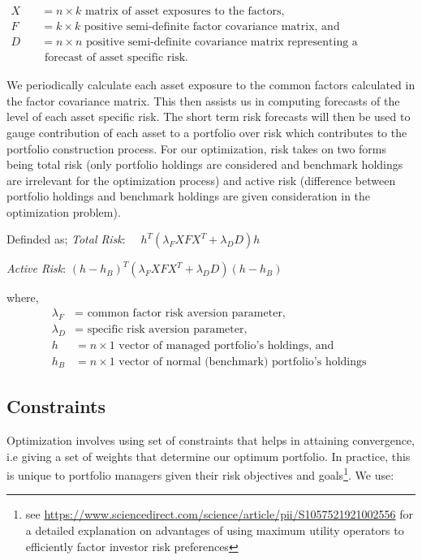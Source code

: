 \documentclass[10pt,preprint, authoryear]{elsarticle}
\numberwithin{equation}{section}
\numberwithin{figure}{section}
\numberwithin{table}{section}
\let\rmarkdownfootnote\footnote%
\def\footnote{\protect\rmarkdownfootnote}
\begin{document}
\(\begin{array} {ll}X & =n \times k \text { matrix of asset exposures to the factors, } \\ F \quad &= k \times k \text { positive semi-definite factor covariance matrix, and } \\ D \quad &=n \times n \text { positive semi-definite covariance matrix representing a } \\ & \text { forecast of asset specific risk. }\end{array}\)

We periodically calculate each asset exposure to the common factors
calculated in the factor covariance matrix. This then assists us in
computing forecasts of the level of each asset specific risk. The short
term risk forecasts will then be used to gauge contribution of each
asset to a portfolio over risk which contributes to the portfolio
construction process. For our optimization, risk takes on two forms
being total risk (only portfolio holdings are considered and benchmark
holdings are irrelevant for the optimization process) and active risk
(difference between portfolio holdings and benchmark holdings are given
consideration in the optimization problem).

Definded as; \emph{Total Risk}:
\(\quad h^T\left(\lambda_F X F X^T+\lambda_D D\right) h\)

\emph{Active Risk}:
\(\left(h-h_B\right)^T\left(\lambda_F X F X^T+\lambda_D D\right)\left(h-h_B\right)\)

where, \[
\begin{aligned}
\lambda_F & =\text { common factor risk aversion parameter, } \\
\lambda_D & =\text { specific risk aversion parameter, } \\
h & =n \times 1 \text { vector of managed portfolio's holdings, and } \\
h_B & =n \times 1 \text { vector of normal (benchmark) portfolio's holdings }
\end{aligned}
\]

\hypertarget{constraints}{%
\subsection*{Constraints}\label{constraints}}

Optimization involves using set of constraints that helps in attaining
convergence, i.e giving a set of weights that determine our optimum
portfolio. In practice, this is unique to portfolio managers given their
risk objectives and goals\footnote{see
  \url{https://www.sciencedirect.com/science/article/pii/S1057521921002556}
  for a detailed explanation on advantages of using maximum utility
  operators to efficiently factor investor risk preferences}. We use:
\end{document}
